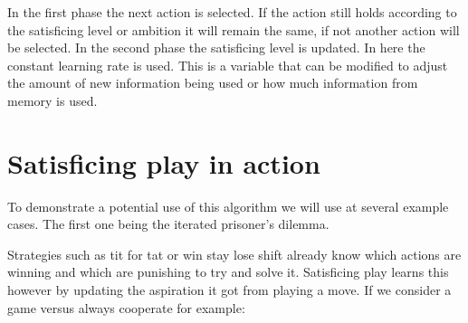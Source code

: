 \toReview In the first phase the next action is selected. If the action still holds
according to the satisficing level or ambition it will remain the same, if not another
action will be selected. In the second phase the satisficing level is updated.
In here the constant learning rate is used. This is a variable that can be
modified to adjust the amount of new information being used or how much
information from memory is used.


\section{Satisficing play in action}
\toReview
To demonstrate a potential use of this algorithm we will use at several example
cases. The first one being the iterated prisoner's dilemma.

\noindent
{}
\toReview Strategies such as tit for tat or win stay lose shift already know
which actions are winning and which are punishing to try and solve it.
Satisficing play learns this however by updating the aspiration it got from
playing a move. If we consider a game versus always cooperate for example:

